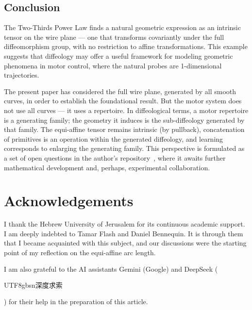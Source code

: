 \documentclass[10pt,letterpaper,reqno]{amsart}
\begin{document}
  \subsection*{Conclusion}
  
  The Two-Thirds Power Law finds a natural geometric expression as an intrinsic tensor on the wire plane ---
  one that transforms covariantly under the full diffeomorphism group,
  with no restriction to affine transformations.
  This example suggests that diffeology may offer a useful framework for modeling geometric phenomena in motor control,
  where the natural probes are 1-dimensional trajectories.
  
  The present paper has considered the full wire plane, generated by all smooth curves,
  in order to establish the foundational result.
  But the motor system does not use all curves --- it uses a repertoire.
  In diffeological terms, a motor repertoire is a generating family;
  the geometry it induces is the sub-diffeology generated by that family.
  The equi-affine tensor remains intrinsic (by pullback),
  concatenation of primitives is an operation within the generated diffeology,
  and learning corresponds to enlarging the generating family.
  This perspective is formulated as a set of open questions in the author's repository~\cite{PIZ26b},
  where it awaits further mathematical development and, perhaps, experimental collaboration.
  
  \section*{Acknowledgements}
  I thank the Hebrew University of Jerusalem for its continuous academic support.
  I am deeply indebted to Tamar Flash and Daniel Bennequin.
  It is through them that I became acquainted with this subject,
  and our discussions were the starting point of my reflection on the equi-affine arc length.
  
  I am also grateful to the AI assistants Gemini (Google) and DeepSeek
  (\begin{CJK}{UTF8}{gbsn}深度求索\end{CJK})
  for their help in the preparation of this article.
  
\end{document}
